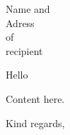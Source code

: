 \documentclass[fontsize=12px,paper=a4]{scrlttr2}
\begin{document}
\begin{letter}{Name and \\ Adress \\ of \\recipient}

	\opening{Hello}
	Content here.

	\closing{Kind regards,}
\end{letter}
\end{document}
